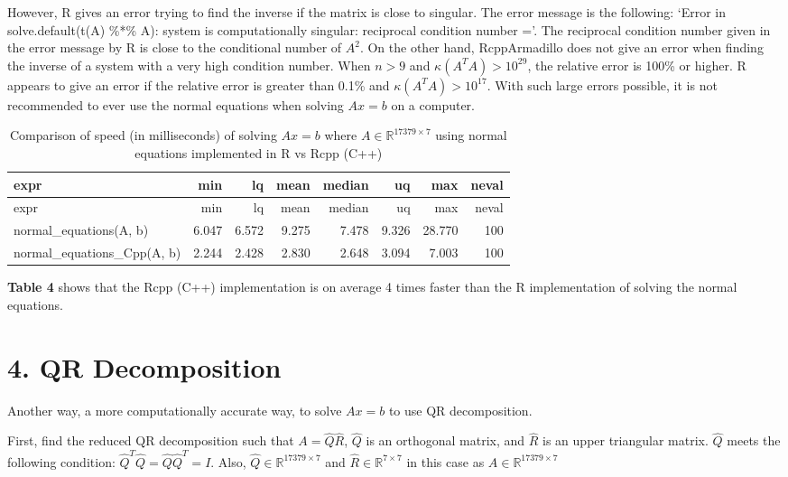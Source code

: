 \documentclass[
]{article}
\begin{document}
However, R gives an error trying to find the inverse if the matrix is
close to singular. The error message is the following: `Error in
solve.default(t(A) \%*\% A): system is computationally singular:
reciprocal condition number ='. The reciprocal condition number given in
the error message by R is close to the conditional number of \(A^{2}\).
On the other hand, RcppArmadillo does not give an error when finding the
inverse of a system with a very high condition number. When \(n > 9\)
and \(\kappa(A^{T}A) > 10^{29}\), the relative error is 100\% or higher.
R appears to give an error if the relative error is greater than 0.1\%
and \(\kappa(A^{T}A) > 10^{17}\). With such large errors possible, it is
not recommended to ever use the normal equations when solving \(Ax = b\)
on a computer.

\begin{longtable}[]{@{}lrrrrrrr@{}}
\caption{Comparison of speed (in milliseconds) of solving \(Ax = b\)
where \(A \in \mathbb{R}^{17379 \times 7}\) using normal equations
implemented in R vs Rcpp (C++)}\tabularnewline
\toprule
expr & min & lq & mean & median & uq & max & neval\tabularnewline
\midrule
\endfirsthead
\toprule
expr & min & lq & mean & median & uq & max & neval\tabularnewline
\midrule
\endhead
normal\_equations(A, b) & 6.047 & 6.572 & 9.275 & 7.478 & 9.326 & 28.770
& 100\tabularnewline
normal\_equations\_Cpp(A, b) & 2.244 & 2.428 & 2.830 & 2.648 & 3.094 &
7.003 & 100\tabularnewline
\bottomrule
\end{longtable}

\textbf{Table 4} shows that the Rcpp (C++) implementation is on average
4 times faster than the R implementation of solving the normal
equations.

\hypertarget{qr-decomposition}{%
\section{4. QR Decomposition}\label{qr-decomposition}}

Another way, a more computationally accurate way, to solve \(Ax = b\) to
use QR decomposition.

First, find the reduced QR decomposition such that
\(A = \hat{Q}\hat{R}\), \(\hat{Q}\) is an orthogonal matrix, and
\(\hat{R}\) is an upper triangular matrix. \(\hat{Q}\) meets the
following condition: \(\hat{Q}^{T}\hat{Q} = \hat{Q}\hat{Q}^{T} = I\).
Also, \(\hat{Q} \in \mathbb{R}^{17379 \times 7}\) and
\(\hat{R} \in \mathbb{R}^{7 \times 7}\) in this case as
\(A \in \mathbb{R}^{17379 \times 7}\)
\end{document}
